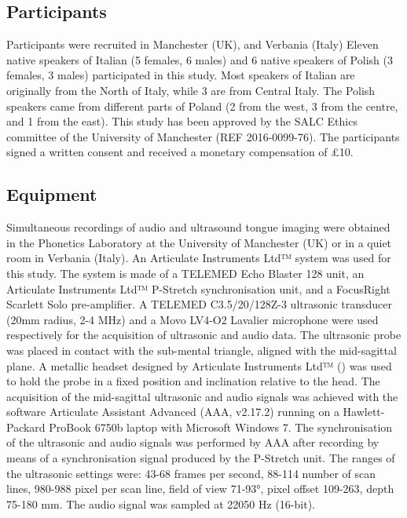 \documentclass[12pt,]{article}
\begin{document}
\hypertarget{participants}{%
\subsection{Participants}\label{participants}}

Participants were recruited in Manchester (UK), and Verbania (Italy)
Eleven native speakers of Italian (5 females, 6 males) and 6 native
speakers of Polish (3 females, 3 males) participated in this study. Most
speakers of Italian are originally from the North of Italy, while 3 are
from Central Italy. The Polish speakers came from different parts of
Poland (2 from the west, 3 from the centre, and 1 from the east). This
study has been approved by the SALC Ethics committee of the University
of Manchester (REF 2016-0099-76). The participants signed a written
consent and received a monetary compensation of £10.

\hypertarget{equipment}{%
\subsection{Equipment}\label{equipment}}

\label{s:equipment}

Simultaneous recordings of audio and ultrasound tongue imaging were
obtained in the Phonetics Laboratory at the University of Manchester
(UK) or in a quiet room in Verbania (Italy). An Articulate Instruments
Ltd™ system was used for this study. The system is made of a TELEMED
Echo Blaster 128 unit, an Articulate Instruments Ltd™ P-Stretch
synchronisation unit, and a FocusRight Scarlett Solo pre-amplifier. A
TELEMED C3.5/20/128Z-3 ultrasonic transducer (20mm radius, 2-4 MHz) and
a Movo LV4-O2 Lavalier microphone were used respectively for the
acquisition of ultrasonic and audio data. The ultrasonic probe was
placed in contact with the sub-mental triangle, aligned with the
mid-sagittal plane. A metallic headset designed by Articulate
Instruments Ltd™ (\citeyear{articulate2008}) was used to hold the probe
in a fixed position and inclination relative to the head. The
acquisition of the mid-sagittal ultrasonic and audio signals was
achieved with the software Articulate Assistant Advanced (AAA, v2.17.2)
running on a Hawlett-Packard ProBook 6750b laptop with Microsoft Windows
7. The synchronisation of the ultrasonic and audio signals was performed
by AAA after recording by means of a synchronisation signal produced by
the P-Stretch unit. The ranges of the ultrasonic settings were: 43-68
frames per second, 88-114 number of scan lines, 980-988 pixel per scan
line, field of view 71-93°, pixel offset 109-263, depth 75-180 mm. The
audio signal was sampled at 22050 Hz (16-bit).
\end{document}
